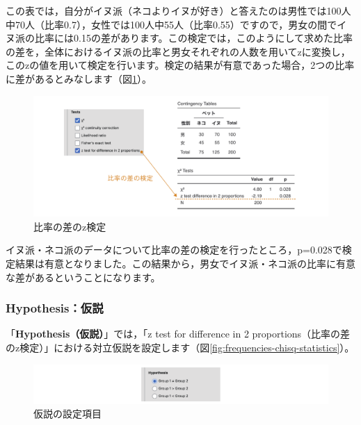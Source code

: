 \documentclass[
  12pt,
  a5jpaper,
  lualatex, ja=standard]{bxjsbook}
\begin{document}
この表では，自分がイヌ派（ネコよりイヌが好き）と答えたのは男性では100人中70人（比率0.7），女性では100人中55人（比率0.55）ですので，男女の間でイヌ派の比率には0.15の差があります。この検定では，このようにして求めた比率の差を，全体におけるイヌ派の比率と男女それぞれの人数を用いてzに変換し，このzの値を用いて検定を行います。検定の結果が有意であった場合，2つの比率に差があるとみなします（図\ref{fig:frequencies-chisq-ztest}）。

\begin{figure}[!ht]

{\centering \includegraphics[width=1\linewidth]{images/frequencies/chisq-ztest} 

}

\caption{比率の差のz検定}\label{fig:frequencies-chisq-ztest}
\end{figure}

イヌ派・ネコ派のデータについて比率の差の検定を行ったところ，p=0.028で検定結果は有意となりました。この結果から，男女でイヌ派・ネコ派の比率に有意な差があるということになります。

\hypertarget{hypothesisux4eeeux8aac-2}{%
\subsubsection*{Hypothesis：仮説}\label{hypothesisux4eeeux8aac-2}}

「\textbf{Hypothesis（仮説）}」では，「z test for difference in 2 proportions（比率の差のz検定）」における対立仮説を設定します（図\ref{fig:frequencies-chisq-statistics}）。

\begin{figure}[!ht]

{\centering \includegraphics[width=1\linewidth]{images/frequencies/chisq-statistics-hypothesis} 

}

\caption{仮説の設定項目}\label{fig:frequencies-chisq-statistics-hypothesis}
\end{figure}
\end{document}
